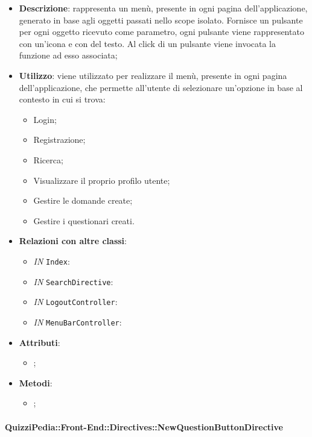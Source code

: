 \begin{itemize}
	\item \textbf{Descrizione}: rappresenta un menù, presente in ogni pagina dell'applicazione, generato in base agli oggetti passati nello scope isolato. Fornisce un pulsante per ogni oggetto ricevuto come parametro, ogni pulsante viene rappresentato con un’icona e con del testo. Al click di un pulsante viene invocata la funzione ad esso associata;
	\item \textbf{Utilizzo}: viene utilizzato per realizzare il menù, presente in ogni pagina dell'applicazione, che permette all'utente di selezionare un'opzione in base al contesto in cui si trova:
		\begin{itemize}
			\item Login;
			\item Registrazione;
			\item Ricerca;
			\item Visualizzare il proprio profilo utente;
			\item Gestire le domande create;
			\item Gestire i questionari creati.
		\end{itemize}
	\item \textbf{Relazioni con altre classi}: 
	\begin{itemize}
		\item \textit{IN} \texttt{Index}: 
		\item \textit{IN} \texttt{SearchDirective}: 
		\item \textit{IN} \texttt{LogoutController}: 
		\item \textit{IN} \texttt{MenuBarController}: 
	\end{itemize}
	\item \textbf{Attributi}: 
	\begin{itemize}
		\item ;
	\end{itemize}
	\item \textbf{Metodi}: 
	\begin{itemize}
		\item ;
	\end{itemize}
\end{itemize}

\paragraph{QuizziPedia::Front-End::Directives::NewQuestionButtonDirective}

\label{QuizziPedia::Front-End::Directives::NewQuestionButtonDirective}

